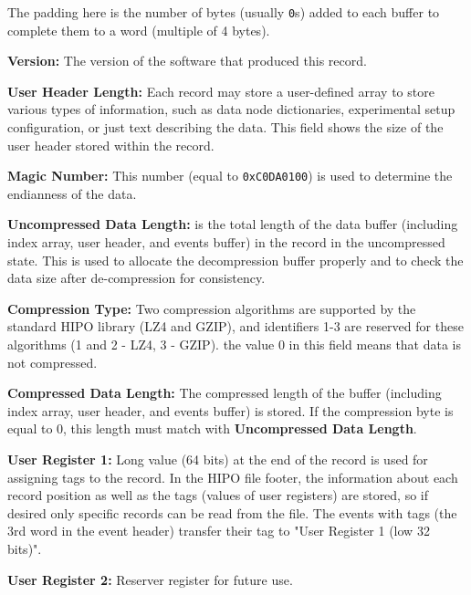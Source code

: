 \documentclass[preprint,12pt]{elsarticle}
\begin{document}
The padding here is the number of bytes (usually {\tt 0}s) added to each buffer to complete them to a word (multiple of 4 bytes).

{\bf Version:} The version of the software that produced this record.
 
{\bf User Header Length:} Each record may store a user-defined array to store various types of information, such as data node dictionaries, experimental setup
configuration, or just text describing the data. This field shows the size of the user header stored within the record.

{\bf Magic Number:} This number (equal to {\tt 0xC0DA0100}) is used to determine the endianness of the data.

{\bf Uncompressed Data Length:} is the total length of the data buffer (including index array, user header, and events buffer) in the record in the uncompressed state. This is used to allocate the decompression buffer properly and to check the data size after de-compression for consistency. 

{\bf Compression Type:} Two compression algorithms are supported by the standard HIPO library (LZ4 and GZIP), and identifiers 1-3 are reserved for these algorithms 
(1 and 2 - LZ4, 3 - GZIP). the value 0 in this field means that data is not compressed. 

{\bf Compressed Data Length:} The compressed length of the buffer (including index array, user header, and events buffer) is stored. If the compression byte is equal to 0,
this length must match with {\bf Uncompressed Data Length}.

{\bf User Register 1:} Long value (64 bits) at the end of the record is used for assigning tags to the record. In the HIPO file footer, the information about each record position 
as well as the tags (values of user registers) are stored, so if desired only specific records can be read from the file. The events with tags (the 3rd word in the event header)
transfer their tag to "User Register 1 (low 32 bits)".

{\bf User Register 2:} Reserver register for future use.
 
\end{document}
